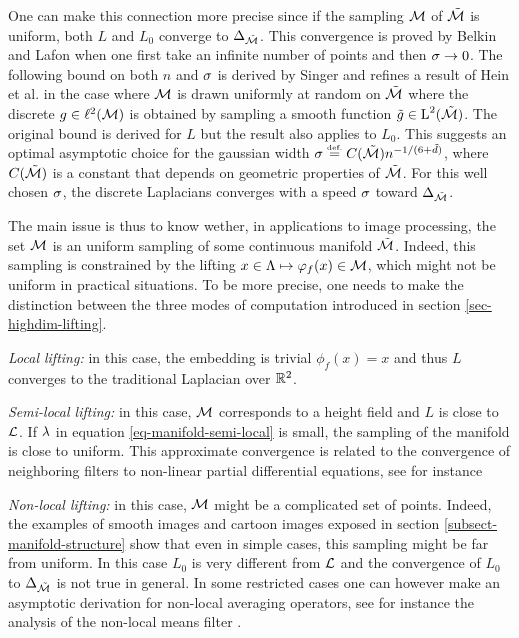 \documentclass[final]{siamltex}
\newcommand{\manilift}{\phi_f}
\begin{document}
One can make this connection more precise since if the sampling $\mathcal{M}$ of $\tilde {\mathcal{M}}$ is uniform, both $L$ and $L_0$ converge to $\Delta_{\tilde {\mathcal{M}}}$. 
This convergence is proved by Belkin \cite{belkin-laplacian-eigenmaps} and Lafon \cite{coifman-geometric-diffusion} when one first take an infinite number of points and then $\sigma \rightarrow 0$. The following bound on both $n$ and $\sigma$ is derived by Singer \cite{singer-graph-manifold} and refines a result of Hein et al. \cite{hein-graph-to-manifold} in the case where $\mathcal{M}$ is drawn uniformly at random on $\tilde {\mathcal{M}}$
where the discrete $g \in \ell^2(\mathcal{M})$ is obtained by sampling a smooth function $\tilde g \in \text{\upshape L}^2(\tilde {\mathcal{M}})$.
The original bound \cite{singer-graph-manifold,hein-graph-to-manifold} is derived for $L$ but the result also applies to $L_0$.
This suggests an optimal asymptotic choice for the gaussian width $\sigma \stackrel{\mbox{\upshape\tiny def.}}{=} C(\tilde {\mathcal{M}}) n^{-1/(6+\tilde d)}$, where $C(\tilde {\mathcal{M}})$ is a constant that depends on geometric properties of $\tilde {\mathcal{M}}$. For this well chosen $\sigma$, the discrete Laplacians converges with a speed $\sigma$ toward $\Delta_{\tilde {\mathcal{M}}}$.

The main issue is thus to know wether, in applications to image processing, the set $\mathcal{M}$ is an uniform sampling of some continuous manifold $\tilde {\mathcal{M}}$. Indeed, this sampling is constrained by the lifting $x \in \La \mapsto \manilift(x) \in \Mm$, which might not be uniform in practical situations. To be more precise, one needs to make the distinction between the three modes of computation introduced in section \ref{sec-highdim-lifting}.
\begin{rs}
	\item  \textit{Local lifting:} in this case, the embedding is trivial $\manilift(x)=x$ and thus $L$ converges to 
	the traditional Laplacian over $\mathbb{R}^2$. 
	\item \textit{Semi-local lifting:} in this case, $\mathcal{M}$ corresponds to a height field and $L$ is close to $\mathcal{L}$. If $\lambda$ in equation \eqref{eq-manifold-semi-local} is small, the sampling of the manifold is close to uniform. This approximate convergence is related to the convergence of neighboring filters to non-linear partial differential equations, see for instance \cite{barash-bilateral-pde,elad-bilateral,sochen-diffusion-confusion}
	\item \textit{Non-local lifting:} in this case, $\mathcal{M}$ might be a complicated set of points. Indeed, the examples of smooth images and cartoon images exposed in section \ref{subsect-manifold-structure} show that even in simple cases, this sampling might be far from uniform. In this case $L_0$ is very different from $\mathcal{L}$ and the convergence of $L_0$ to $\Delta_{\tilde {\mathcal{M}}}$ is not true in general. In some restricted cases one can however make an asymptotic derivation for non-local averaging operators, see for instance the analysis of the non-local means filter \cite{buades-pde}.
\end{rs}
 
\end{document}
